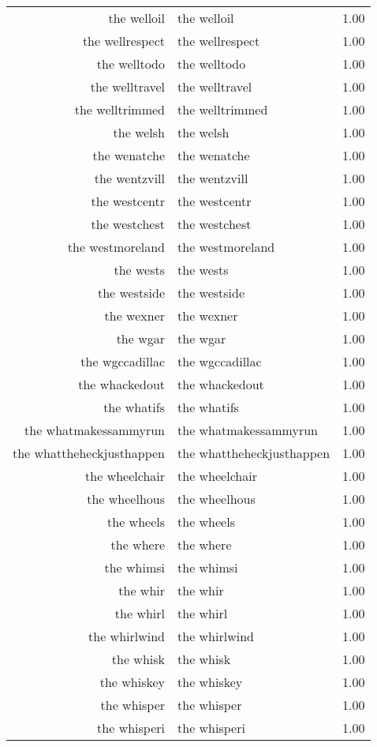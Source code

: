 \begin{table}[ht]
\begin{tabular}{rlr}
  the welloil & the welloil & 1.00 \\ 
  the wellrespect & the wellrespect & 1.00 \\ 
  the welltodo & the welltodo & 1.00 \\ 
  the welltravel & the welltravel & 1.00 \\ 
  the welltrimmed & the welltrimmed & 1.00 \\ 
  the welsh & the welsh & 1.00 \\ 
  the wenatche & the wenatche & 1.00 \\ 
  the wentzvill & the wentzvill & 1.00 \\ 
  the westcentr & the westcentr & 1.00 \\ 
  the westchest & the westchest & 1.00 \\ 
  the westmoreland & the westmoreland & 1.00 \\ 
  the wests & the wests & 1.00 \\ 
  the westside & the westside & 1.00 \\ 
  the wexner & the wexner & 1.00 \\ 
  the wgar & the wgar & 1.00 \\ 
  the wgccadillac & the wgccadillac & 1.00 \\ 
  the whackedout & the whackedout & 1.00 \\ 
  the whatifs & the whatifs & 1.00 \\ 
  the whatmakessammyrun & the whatmakessammyrun & 1.00 \\ 
  the whattheheckjusthappen & the whattheheckjusthappen & 1.00 \\ 
  the wheelchair & the wheelchair & 1.00 \\ 
  the wheelhous & the wheelhous & 1.00 \\ 
  the wheels & the wheels & 1.00 \\ 
  the where & the where & 1.00 \\ 
  the whimsi & the whimsi & 1.00 \\ 
  the whir & the whir & 1.00 \\ 
  the whirl & the whirl & 1.00 \\ 
  the whirlwind & the whirlwind & 1.00 \\ 
  the whisk & the whisk & 1.00 \\ 
  the whiskey & the whiskey & 1.00 \\ 
  the whisper & the whisper & 1.00 \\ 
  the whisperi & the whisperi & 1.00 \\ 

\end{tabular}
\end{table}

